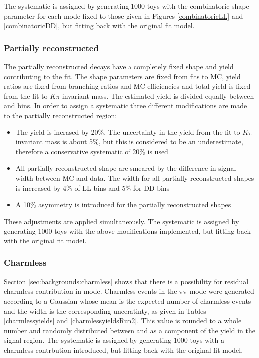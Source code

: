 The systematic is assigned by generating 1000 toys with the combinatoric shape parameter for each mode fixed to those given in Figures \ref{combinatoricLL} and \ref{combinatoricDD}, but fitting back with the original fit model.

\subsubsection{Partially reconstructed}
\label{sec:systematics:partreco}

The partially reconstructed decays have a completely fixed shape and yield contributing to the \CP fit. The shape parameters are fixed from fits to MC, yield ratios are fixed from branching ratios and MC efficiencies and total yield is fixed from the fit to $K\pi$ invariant mass. The estimated yield is divided equally between \Bp and \Bm bins. In order to assign a systematic three different modifications are made to the partially reconstructed region:

\begin{itemize}
\item The yield is incrased by 20\%. The uncertainty in the yield from the fit to $K\pi$ invariant mass is about 5\%, but this is considered to be an underestimate, therefore a conservative systematic of 20\% is used
\item All partially reconstructed shape are smeared by the difference in signal width between MC and data. The width for all partially reconstructed shapes is increased by 4\% of LL bins and 5\% for DD bins
\item A 10\% asymmetry is introduced for the partially reconstructed shapes
\end{itemize}

These adjustments are applied simultaneously. The systematic is assigned by generating 1000 toys with the above modifications implemented, but fitting back with the original fit model.

\subsubsection{Charmless}

Section \ref{sec:backgrounds:charmless} shows that there is a possibility for residual charmless contribution in \decay{\D}{\pi\pi} mode. Charmless events in the $\pi\pi$ mode were generated according to a Gaussian whose mean is the expected number of charmless events and the width is the corresponding unceratinty, as given in Tables \ref{charmlessyields} and \ref{charmlessyieldsRun2}. This value is rounded to a whole number and randomly distributed between \Bp and \Bm as a component of the yield in the signal region. The systematic is assigned by generating 1000 toys with a charmless contrbution introduced, but fitting back with the original fit model.

